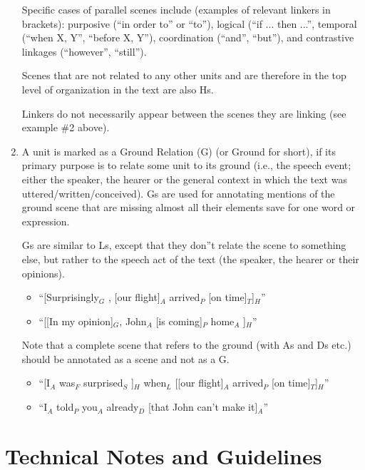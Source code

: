 \documentclass[11pt]{article}
\begin{document}
\begin{enumerate}
Specific cases of parallel scenes include (examples of relevant linkers in brackets): purposive (``in order to'' or ``to''), logical (``if ... then ...'', temporal (``when X, Y'', ``before X, Y''), coordination (``and'', ``but''), and contrastive linkages (``however'', ``still'').

Scenes that are not related to any other units and are therefore in the top level of organization in the text are also Hs.

Linkers do not necessarily appear between the scenes they are linking (see example \#2 above).

\item
A unit is marked as a Ground Relation (G) (or Ground for short), if its primary purpose is to relate some unit to its ground (i.e., the speech event; either the speaker, the hearer or the general context in which the text was uttered/written/conceived). Gs are used for annotating mentions of the ground scene that are missing almost all their elements save for one word or expression.

Gs are similar to Ls, except that they don''t relate the scene to something else, but rather to the speech act of the text (the speaker, the hearer or their opinions).

\begin{itemize}
\item
``[Surprisingly$_G$ , [our flight]$_A$ arrived$_P$ [on time]$_T$]$_H$''
\item
``[[In my opinion]$_G$, John$_A$ [is coming]$_P$ home$_A$ ]$_H$''
\end{itemize}

Note that a complete scene that refers to the ground (with As and Ds etc.) should be annotated as a scene and not as a G.

\begin{itemize}
\item
``[I$_A$ was$_F$ surprised$_S$ ]$_H$ when$_L$ [[our flight]$_A$ arrived$_P$ [on time]$_T$]$_H$''
\item
``I$_A$ told$_P$ you$_A$ already$_D$ [that John can't make it]$_A$''
\end{itemize}

\end{enumerate}


\section*{\large Technical Notes and Guidelines}
\end{document}
